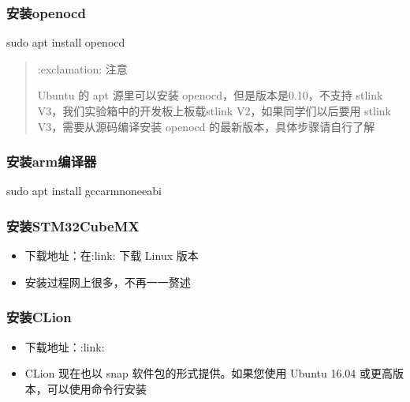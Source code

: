 \documentclass[a4paper,12pt,english]{sphinxmanual}
\begin{document}
\subsubsection{安装openocd}
\label{\detokenize{exp-stm32/ide-setup:openocd}}
\begin{sphinxVerbatim}[commandchars=\\\{\}]
sudo apt install openocd
\end{sphinxVerbatim}
\begin{quote}

\sphinxAtStartPar
:exclamation: 注意

\sphinxAtStartPar
Ubuntu 的 apt 源里可以安装 openocd，但是版本是0.10，不支持 stlink V3，我们实验箱中的开发板上板载stlink V2，如果同学们以后要用 stlink V3，需要从源码编译安装 openocd 的最新版本，具体步骤请自行了解
\end{quote}


\subsubsection{安装arm编译器}
\label{\detokenize{exp-stm32/ide-setup:arm}}
\begin{sphinxVerbatim}[commandchars=\\\{\}]
sudo apt install gcc\PYGZhy{}arm\PYGZhy{}none\PYGZhy{}eabi
\end{sphinxVerbatim}


\subsubsection{安装STM32CubeMX}
\label{\detokenize{exp-stm32/ide-setup:stm32cubemx}}\begin{itemize}
\item {} 
\sphinxAtStartPar
下载地址：在:link:  下载 Linux 版本

\item {} 
\sphinxAtStartPar
安装过程网上很多，不再一一赘述



\end{itemize}


\subsubsection{安装CLion}
\label{\detokenize{exp-stm32/ide-setup:clion}}\begin{itemize}
\item {} 
\sphinxAtStartPar
下载地址：:link:

\item {} 
\sphinxAtStartPar
CLion 现在也以 snap 软件包的形式提供。如果您使用 Ubuntu 16.04 或更高版本，可以使用命令行安装

\end{itemize}
\end{document}
